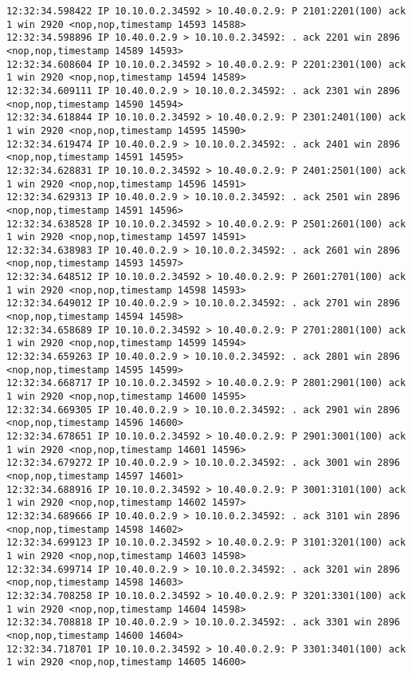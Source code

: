 \documentclass[a4paper,12pt]{article}
\begin{document}
\begin{lstlisting}
12:32:34.598422 IP 10.10.0.2.34592 > 10.40.0.2.9: P 2101:2201(100) ack 1 win 2920 <nop,nop,timestamp 14593 14588>
12:32:34.598896 IP 10.40.0.2.9 > 10.10.0.2.34592: . ack 2201 win 2896 <nop,nop,timestamp 14589 14593>
12:32:34.608604 IP 10.10.0.2.34592 > 10.40.0.2.9: P 2201:2301(100) ack 1 win 2920 <nop,nop,timestamp 14594 14589>
12:32:34.609111 IP 10.40.0.2.9 > 10.10.0.2.34592: . ack 2301 win 2896 <nop,nop,timestamp 14590 14594>
12:32:34.618844 IP 10.10.0.2.34592 > 10.40.0.2.9: P 2301:2401(100) ack 1 win 2920 <nop,nop,timestamp 14595 14590>
12:32:34.619474 IP 10.40.0.2.9 > 10.10.0.2.34592: . ack 2401 win 2896 <nop,nop,timestamp 14591 14595>
12:32:34.628831 IP 10.10.0.2.34592 > 10.40.0.2.9: P 2401:2501(100) ack 1 win 2920 <nop,nop,timestamp 14596 14591>
12:32:34.629313 IP 10.40.0.2.9 > 10.10.0.2.34592: . ack 2501 win 2896 <nop,nop,timestamp 14591 14596>
12:32:34.638528 IP 10.10.0.2.34592 > 10.40.0.2.9: P 2501:2601(100) ack 1 win 2920 <nop,nop,timestamp 14597 14591>
12:32:34.638983 IP 10.40.0.2.9 > 10.10.0.2.34592: . ack 2601 win 2896 <nop,nop,timestamp 14593 14597>
12:32:34.648512 IP 10.10.0.2.34592 > 10.40.0.2.9: P 2601:2701(100) ack 1 win 2920 <nop,nop,timestamp 14598 14593>
12:32:34.649012 IP 10.40.0.2.9 > 10.10.0.2.34592: . ack 2701 win 2896 <nop,nop,timestamp 14594 14598>
12:32:34.658689 IP 10.10.0.2.34592 > 10.40.0.2.9: P 2701:2801(100) ack 1 win 2920 <nop,nop,timestamp 14599 14594>
12:32:34.659263 IP 10.40.0.2.9 > 10.10.0.2.34592: . ack 2801 win 2896 <nop,nop,timestamp 14595 14599>
12:32:34.668717 IP 10.10.0.2.34592 > 10.40.0.2.9: P 2801:2901(100) ack 1 win 2920 <nop,nop,timestamp 14600 14595>
12:32:34.669305 IP 10.40.0.2.9 > 10.10.0.2.34592: . ack 2901 win 2896 <nop,nop,timestamp 14596 14600>
12:32:34.678651 IP 10.10.0.2.34592 > 10.40.0.2.9: P 2901:3001(100) ack 1 win 2920 <nop,nop,timestamp 14601 14596>
12:32:34.679272 IP 10.40.0.2.9 > 10.10.0.2.34592: . ack 3001 win 2896 <nop,nop,timestamp 14597 14601>
12:32:34.688916 IP 10.10.0.2.34592 > 10.40.0.2.9: P 3001:3101(100) ack 1 win 2920 <nop,nop,timestamp 14602 14597>
12:32:34.689666 IP 10.40.0.2.9 > 10.10.0.2.34592: . ack 3101 win 2896 <nop,nop,timestamp 14598 14602>
12:32:34.699123 IP 10.10.0.2.34592 > 10.40.0.2.9: P 3101:3201(100) ack 1 win 2920 <nop,nop,timestamp 14603 14598>
12:32:34.699714 IP 10.40.0.2.9 > 10.10.0.2.34592: . ack 3201 win 2896 <nop,nop,timestamp 14598 14603>
12:32:34.708258 IP 10.10.0.2.34592 > 10.40.0.2.9: P 3201:3301(100) ack 1 win 2920 <nop,nop,timestamp 14604 14598>
12:32:34.708818 IP 10.40.0.2.9 > 10.10.0.2.34592: . ack 3301 win 2896 <nop,nop,timestamp 14600 14604>
12:32:34.718701 IP 10.10.0.2.34592 > 10.40.0.2.9: P 3301:3401(100) ack 1 win 2920 <nop,nop,timestamp 14605 14600>

\end{lstlisting}
\end{document}
